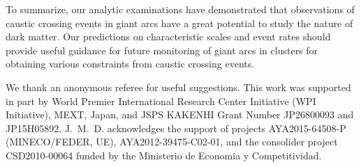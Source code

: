 \documentclass[showpacs,twocolumn,preprintnumbers,amsmath,amssymb,superscriptaddress,nofootinbib]{revtex4}
\begin{document}
To summarize, our analytic examinations have demonstrated that
observations of caustic crossing events in giant arcs have a great
potential to study the nature of dark matter. Our predictions on
characteristic scales and event rates should provide useful guidance
for future monitoring of giant arcs in clusters for obtaining various
constraints from caustic crossing events.

\acknowledgments 
We thank an anonymous referee for useful suggestions.
This work was supported in part by World Premier International
Research Center Initiative (WPI Initiative), MEXT, Japan, and JSPS
KAKENHI Grant Number JP26800093 and JP15H05892.
J.~M.~D. acknowledges the support of projects AYA2015-64508-P
(MINECO/FEDER, UE), AYA2012-39475-C02-01, and the consolider project
CSD2010-00064 funded by the Ministerio de Economia y Competitividad. 
\end{document}
